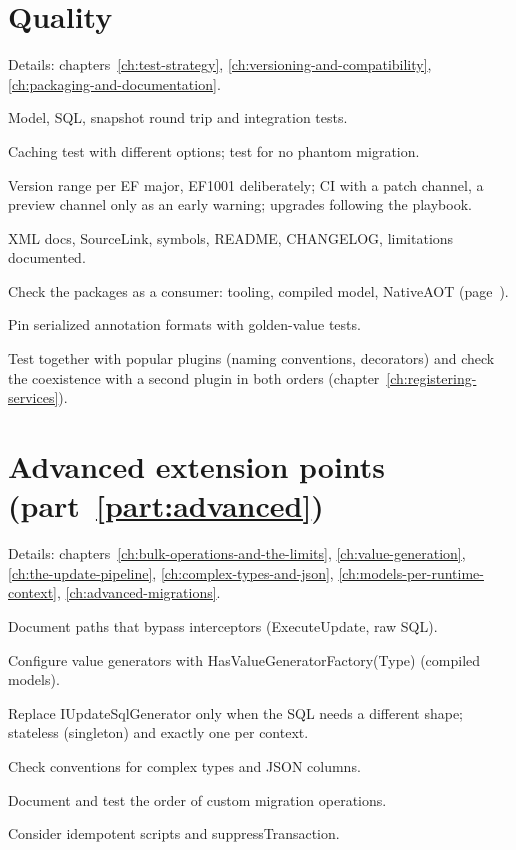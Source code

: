 \section{Quality}

\noindent Details: chapters~\ref{ch:test-strategy}, \ref{ch:versioning-and-compatibility}, \ref{ch:packaging-and-documentation}.

\begin{checklist}
  \item Model, SQL, snapshot round trip and integration tests.
  \item Caching test with different options; test for no phantom migration.
  \item Version range per EF major, EF1001 deliberately; CI with a patch channel, a preview
    channel only as an early warning; upgrades following the playbook.
  \item XML docs, SourceLink, symbols, README, CHANGELOG, limitations documented.
  \item Check the packages as a consumer: tooling, compiled model, NativeAOT
    (page~\pageref{sec:consumer-test}).
  \item Pin serialized annotation formats with golden-value tests.
  \item Test together with popular plugins (naming conventions, decorators) and check the
    coexistence with a second plugin in both orders (chapter~\ref{ch:registering-services}).
\end{checklist}

\section{Advanced extension points (part~\ref{part:advanced})}

\noindent Details: chapters~\ref{ch:bulk-operations-and-the-limits}, \ref{ch:value-generation}, \ref{ch:the-update-pipeline}, \ref{ch:complex-types-and-json}, \ref{ch:models-per-runtime-context}, \ref{ch:advanced-migrations}.

\begin{checklist}
  \item Document paths that bypass interceptors (ExecuteUpdate, raw SQL).
  \item Configure value generators with HasValueGeneratorFactory(Type) (compiled models).
  \item Replace IUpdateSqlGenerator only when the SQL needs a different shape; stateless
    (singleton) and exactly one per context.
  \item Check conventions for complex types and JSON columns.
  \item Document and test the order of custom migration operations.
  \item Consider idempotent scripts and suppressTransaction.
\end{checklist}

